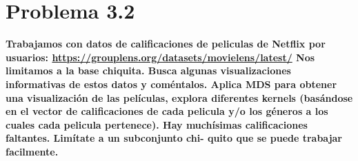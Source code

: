 \section*{Problema 3.2}

\textbf{Trabajamos con datos de calificaciones de peliculas de Netflix por usuarios: \url{https://grouplens.org/datasets/movielens/latest/} Nos limitamos a la base chiquita. Busca algunas visualizaciones informativas de estos datos y coméntalos. Aplica MDS para obtener una visualización de las películas, explora diferentes kernels (basándose en el vector de calificaciones de cada pelicula y/o los géneros a los cuales cada pelicula pertenece). Hay muchísimas calificaciones faltantes. Limítate a un subconjunto chi- quito que se puede trabajar facilmente.}

